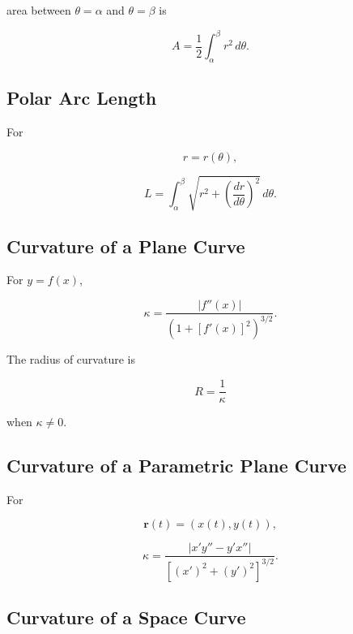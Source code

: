 area between \(\theta=\alpha\) and \(\theta=\beta\) is

\[
\boxed{
A
=
\frac12
\int_\alpha^\beta
r^2\,d\theta.
}
\]

\subsection{Polar Arc Length}
\label{subsec:polar-arc-length-reference}

For

\[
r=r(\theta),
\]

\[
\boxed{
L
=
\int_\alpha^\beta
\sqrt{
r^2
+
\left(
\frac{dr}{d\theta}
\right)^2
}
\,d\theta.
}
\]

\subsection{Curvature of a Plane Curve}
\label{subsec:plane-curvature-reference}

For \(y=f(x)\),

\[
\boxed{
\kappa
=
\frac{
|f''(x)|
}{
\left(
1+[f'(x)]^2
\right)^{3/2}
}.
}
\]

The radius of curvature is

\[
\boxed{
R
=
\frac1\kappa
}
\]

when \(\kappa\neq0\).

\subsection{Curvature of a Parametric Plane Curve}
\label{subsec:parametric-curvature-reference}

For

\[
\mathbf{r}(t)
=
(x(t),y(t)),
\]

\[
\boxed{
\kappa
=
\frac{
|x'y''-y'x''|
}{
\left[
(x')^2+(y')^2
\right]^{3/2}
}.
}
\]

\subsection{Curvature of a Space Curve}
\label{subsec:space-curve-curvature-reference}

